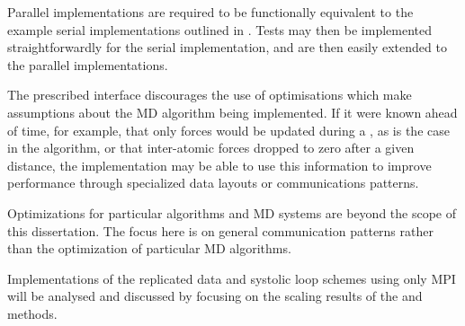 Parallel implementations are required to be functionally equivalent
to the example serial implementations outlined in .
%
Tests may then be implemented straightforwardly for the serial implementation,
and are then easily extended to the parallel implementations.

The prescribed interface discourages the use of optimisations which make
assumptions about the MD algorithm being implemented.
%
If it were known ahead of time, for example, that
only forces would be updated during a \pairoperation{},
as is the case in the \velocityverlet{} algorithm,
or that inter-atomic forces dropped to zero after a given distance,
the implementation may be able to use this information to improve
performance through specialized data layouts or communications patterns.

Optimizations for particular algorithms and MD systems are
beyond the scope of this dissertation.
%
The focus here is on general communication patterns rather than
the optimization of particular MD algorithms.

Implementations of the replicated data and systolic loop schemes
using only MPI will be analysed and discussed by focusing on
the scaling results of the \individualoperation{} and \pairoperation{} methods.





